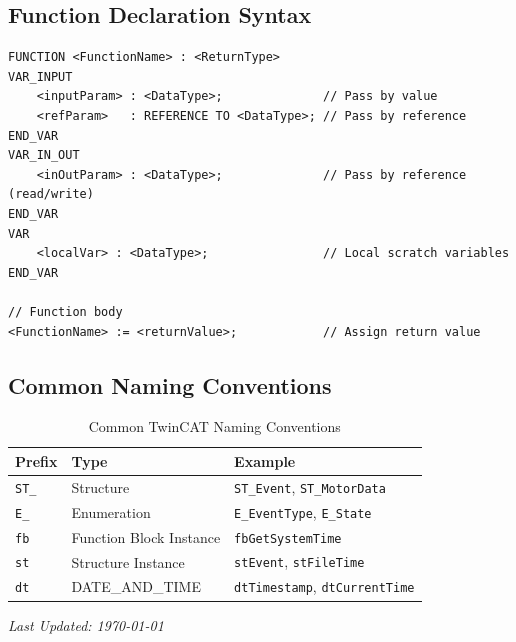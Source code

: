 \documentclass[11pt,a4paper]{article}
\begin{document}
\subsection*{Function Declaration Syntax}

\begin{lstlisting}
FUNCTION <FunctionName> : <ReturnType>
VAR_INPUT
    <inputParam> : <DataType>;              // Pass by value
    <refParam>   : REFERENCE TO <DataType>; // Pass by reference
END_VAR
VAR_IN_OUT
    <inOutParam> : <DataType>;              // Pass by reference (read/write)
END_VAR
VAR
    <localVar> : <DataType>;                // Local scratch variables
END_VAR

// Function body
<FunctionName> := <returnValue>;            // Assign return value
\end{lstlisting}

\subsection*{Common Naming Conventions}

\begin{table}[h]
\centering
\begin{tabular}{@{}lll@{}}
\toprule
\textbf{Prefix} & \textbf{Type} & \textbf{Example} \\
\midrule
\texttt{ST\_} & Structure & \texttt{ST\_Event}, \texttt{ST\_MotorData} \\
\texttt{E\_} & Enumeration & \texttt{E\_EventType}, \texttt{E\_State} \\
\texttt{fb} & Function Block Instance & \texttt{fbGetSystemTime} \\
\texttt{st} & Structure Instance & \texttt{stEvent}, \texttt{stFileTime} \\
\texttt{dt} & DATE\_AND\_TIME & \texttt{dtTimestamp}, \texttt{dtCurrentTime} \\
\bottomrule
\end{tabular}
\caption{Common TwinCAT Naming Conventions}
\end{table}

\vfill

\begin{center}
\textit{Last Updated: \today}
\end{center}
\end{document}
